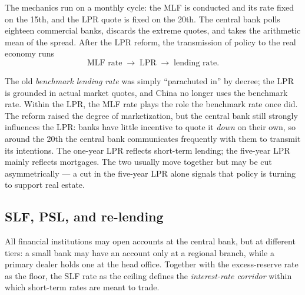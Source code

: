 
The mechanics run on a monthly cycle: the MLF is conducted and its rate fixed on the 15th, and the LPR quote is fixed on the 20th. The central bank polls eighteen commercial banks, discards the extreme quotes, and takes the arithmetic mean of the spread. After the LPR reform, the transmission of policy to the real economy runs
\[
\text{MLF rate} \;\to\; \text{LPR} \;\to\; \text{lending rate}.
\]

\begin{remark}
The old \emph{benchmark lending rate} was simply ``parachuted in'' by decree; the LPR is grounded in actual market quotes, and China no longer uses the benchmark rate. Within the LPR, the MLF rate plays the role the benchmark rate once did. The reform raised the degree of marketization, but the central bank still strongly influences the LPR: banks have little incentive to quote it \emph{down} on their own, so around the 20th the central bank communicates frequently with them to transmit its intentions. The one-year LPR reflects short-term lending; the five-year LPR mainly reflects mortgages. The two usually move together but may be cut asymmetrically --- a cut in the five-year LPR alone signals that policy is turning to support real estate.
\end{remark}

\subsection{SLF, PSL, and re-lending}


All financial institutions may open accounts at the central bank, but at different tiers: a small bank may have an account only at a regional branch, while a primary dealer holds one at the head office. Together with the excess-reserve rate as the floor, the SLF rate as the ceiling defines the \emph{interest-rate corridor} within which short-term rates are meant to trade.

